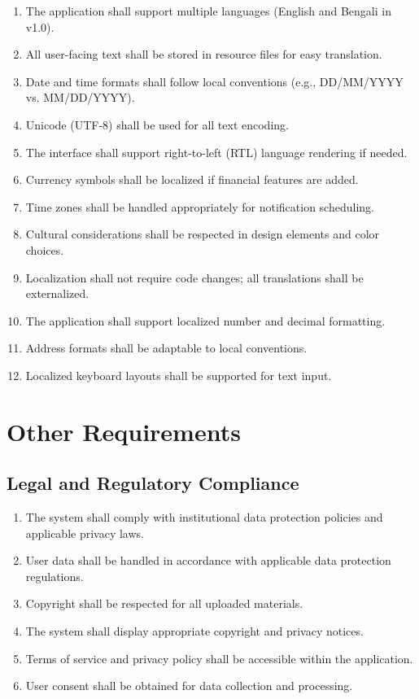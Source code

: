 \documentclass[12pt,a4paper]{article}
\begin{document}
\begin{enumerate}[leftmargin=*, label=\textbf{IL-\arabic*.}, itemsep=4pt]
  \item The application shall support multiple languages (English and Bengali in v1.0).
  \item All user-facing text shall be stored in resource files for easy translation.
  \item Date and time formats shall follow local conventions (e.g., DD/MM/YYYY vs. MM/DD/YYYY).
  \item Unicode (UTF-8) shall be used for all text encoding.
  \item The interface shall support right-to-left (RTL) language rendering if needed.
  \item Currency symbols shall be localized if financial features are added.
  \item Time zones shall be handled appropriately for notification scheduling.
  \item Cultural considerations shall be respected in design elements and color choices.
  \item Localization shall not require code changes; all translations shall be externalized.
  \item The application shall support localized number and decimal formatting.
  \item Address formats shall be adaptable to local conventions.
  \item Localized keyboard layouts shall be supported for text input.
\end{enumerate}
\newpage

\newpage
\section{Other Requirements}

\subsection{Legal and Regulatory Compliance}

\begin{enumerate}[leftmargin=*, label=\textbf{LR-\arabic*.}, itemsep=4pt]
  \item The system shall comply with institutional data protection policies and applicable privacy laws.
  \item User data shall be handled in accordance with applicable data protection regulations.
  \item Copyright shall be respected for all uploaded materials.
  \item The system shall display appropriate copyright and privacy notices.
  \item Terms of service and privacy policy shall be accessible within the application.
  \item User consent shall be obtained for data collection and processing.
\end{enumerate}
\end{document}
